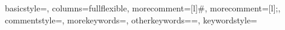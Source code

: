 \usepackage[german]{babel}
\usepackage[T1]{fontenc} %
\usepackage[utf8x]{inputenc}
\usepackage{amsmath}
\usepackage{graphicx}
\usepackage[colorinlistoftodos]{todonotes}
\usepackage{dirtree}
\usepackage{nameref}
\usepackage{listings}
\usepackage{tabularx}
\usepackage{wasysym}

\usepackage{textcomp}
\usepackage{hyperref}
\usepackage{amssymb}
\providecommand\meta[1]{\textlangle{\itshape #1\/}\textrangle}

{
basicstyle=\ttfamily\small,
columns=fullflexible,
morecomment=[l]{\#},
morecomment=[l]{;},
commentstyle=\color{gray}\ttfamily,
morekeywords={},
otherkeywords={=},
keywordstyle={\color{green}\bfseries}
}

\graphicspath{ {../common/} }
